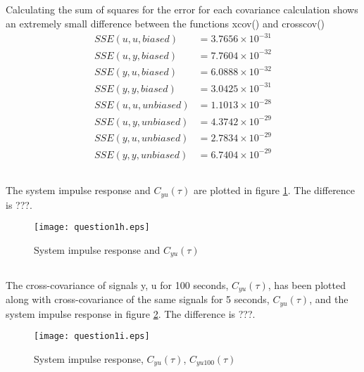 \documentclass[times,12pt,reqno]{amsart}
\begin{document}
\subsection{}
Calculating the sum of squares for the error for each covariance calculation
shows an extremely small difference between the functions xcov() and
crosscov()
\begin{align*}
    SSE(u, u, biased) &= 3.7656 \times 10^{-31} \\
    SSE(u, y, biased) &= 7.7604 \times 10^{-32} \\
    SSE(y, u, biased) &= 6.0888 \times 10^{-32} \\
    SSE(y, y, biased) &= 3.0425 \times 10^{-31} \\
    SSE(u, u, unbiased) &= 1.1013 \times 10^{-28} \\
    SSE(u, y, unbiased) &= 4.3742 \times 10^{-29} \\
    SSE(y, u, unbiased) &= 2.7834 \times 10^{-29} \\
    SSE(y, y, unbiased) &= 6.7404 \times 10^{-29}
\end{align*}

\subsection{}
The system impulse response and $C_{yu}(\tau)$ are plotted in figure \ref{fig:q1h}.
The difference is ???.
\begin{figure}[H]
    \begin{center}
        \texttt{[image: question1h.eps]}
    \end{center}
    \caption{System impulse response and $C_{yu}(\tau)$}
    \label{fig:q1h}
\end{figure}

\subsection{}
The cross-covariance of signals y, u for 100 seconds, $C_{yu}(\tau)$, has been
plotted along with cross-covariance of the same signals for 5 seconds,
$C_{yu}(\tau)$, and the system impulse response in figure \ref{fig:q1i}. The
difference is ???.
\begin{figure}[H]
    \begin{center}
        \texttt{[image: question1i.eps]}
    \end{center}
    \caption{System impulse response, $C_{yu}(\tau)$, $C_{yu100}(\tau)$}
    \label{fig:q1i}
\end{figure}
\end{document}
